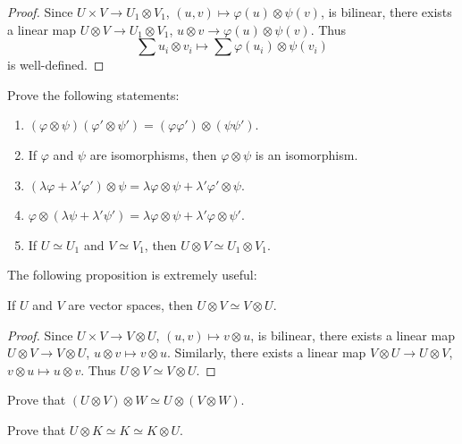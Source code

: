 \begin{proof}
	Since $U\times V\to U_1\otimes V_1$,
	$(u,v)\mapsto\varphi(u)\otimes\psi(v)$, is bilinear, there exists a linear map
	$U\otimes V\to U_1\otimes V_1$, $u\otimes
	v\to\varphi(u)\otimes\psi(v)$. Thus 
	\[
		\sum u_i\otimes v_i\mapsto\sum\varphi(u_i)\otimes\psi(v_i)
	\]
	is well-defined. 
\end{proof}

\begin{exercise}
    Prove the following statements:
	\begin{enumerate}
		\item $(\varphi\otimes\psi)(\varphi'\otimes\psi')=(\varphi\varphi')\otimes(\psi\psi')$.
		\item If $\varphi$ and $\psi$ are isomorphisms, then 
			$\varphi\otimes\psi$ is an isomorphism. 
		\item $(\lambda\varphi+\lambda'\varphi')\otimes\psi=\lambda\varphi\otimes\psi+\lambda'\varphi'\otimes\psi$.
		\item $\varphi\otimes(\lambda\psi+\lambda'\psi')=\lambda\varphi\otimes\psi+\lambda'\varphi\otimes\psi'$.
		\item If $U\simeq U_1$ and $V\simeq V_1$, then $U\otimes V\simeq U_1\otimes V_1$.
	\end{enumerate}
\end{exercise}

The following proposition is extremely useful:

\begin{proposition}
	If $U$ and $V$ are vector spaces, then  
	$U\otimes V\simeq V\otimes U$.
\end{proposition}

\begin{proof}
	Since $U\times V\to V\otimes U$, $(u,v)\mapsto v\otimes u$, is bilinear, there exists 
	a linear map $U\otimes V\to V\otimes U$, $u\otimes
	v\mapsto v\otimes u$. Similarly, there exists a linear map 
	$V\otimes U\to U\otimes V$, $v\otimes u\mapsto
	u\otimes v$. Thus $U\otimes V\simeq V\otimes U$.
\end{proof}

\begin{exercise}
	\label{xca:UxVxW}
    Prove that $(U\otimes V)\otimes W\simeq U\otimes(V\otimes W)$.
\end{exercise}

\begin{exercise}
	\label{xca:UxK}
	Prove that $U\otimes K\simeq K\simeq K\otimes U$.
\end{exercise}

